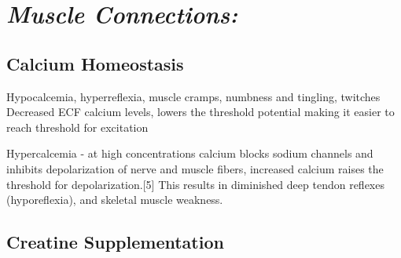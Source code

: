 \section{\textit{Muscle Connections:}}

\subsection{Calcium Homeostasis}
Hypocalcemia, hyperreflexia, muscle cramps, numbness and tingling, twitches
Decreased ECF calcium levels, lowers the threshold potential making it easier to reach threshold for excitation

Hypercalcemia - at high concentrations calcium blocks sodium channels and inhibits depolarization of nerve and muscle fibers, increased calcium raises the threshold for depolarization.[5] This results in diminished deep tendon reflexes (hyporeflexia), and skeletal muscle weakness.
\subsection{Creatine Supplementation}

\printbibliography[heading=subbibintoc]